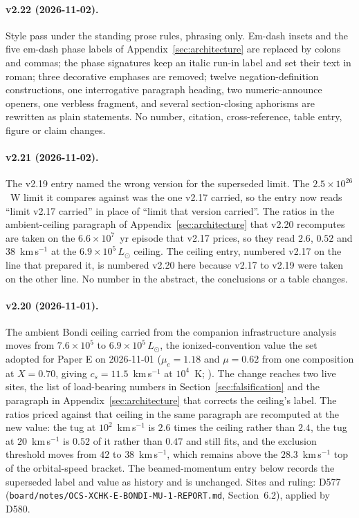 \documentclass[11pt]{article}
\begin{document}
\paragraph{v2.22 (2026-11-02).} Style pass under the standing prose rules, phrasing only. Em-dash insets and the five em-dash phase labels of Appendix~\ref{sec:architecture} are replaced by colons and commas; the phase signatures keep an italic run-in label and set their text in roman; three decorative emphases are removed; twelve negation-definition constructions, one interrogative paragraph heading, two numeric-announce openers, one verbless fragment, and several section-closing aphorisms are rewritten as plain statements. No number, citation, cross-reference, table entry, figure or claim changes.

\paragraph{v2.21 (2026-11-02).} The v2.19 entry named the wrong version for the superseded limit. The $2.5\times10^{26}$~W limit it compares against was the one v2.17 carried, so the entry now reads ``limit v2.17 carried'' in place of ``limit that version carried''. The ratios in the ambient-ceiling paragraph of Appendix~\ref{sec:architecture} that v2.20 recomputes are taken on the $6.6\times10^{7}$~yr episode that v2.17 prices, so they read $2.6$, $0.52$ and $38$~km\,s$^{-1}$ at the $6.9\times10^{5}\,L_\odot$ ceiling. The ceiling entry, numbered v2.17 on the line that prepared it, is numbered v2.20 here because v2.17 to v2.19 were taken on the other line. No number in the abstract, the conclusions or a table changes.

\paragraph{v2.20 (2026-11-01).} The ambient Bondi ceiling carried from the companion infrastructure analysis moves from $7.6\times10^{5}$ to $6.9\times10^{5}\,L_\odot$, the ionized-convention value the set adopted for Paper E on 2026-11-01 ($\mu_e = 1.18$ and $\mu = 0.62$ from one composition at $X = 0.70$, giving $c_s = 11.5$~km\,s$^{-1}$ at $10^{4}$~K; \citealt{Swanson2026Engineered}). The change reaches two live sites, the list of load-bearing numbers in Section~\ref{sec:falsification} and the paragraph in Appendix~\ref{sec:architecture} that corrects the ceiling's label. The ratios priced against that ceiling in the same paragraph are recomputed at the new value: the tug at $10^{2}$~km\,s$^{-1}$ is $2.6$ times the ceiling rather than $2.4$, the tug at $20$~km\,s$^{-1}$ is $0.52$ of it rather than $0.47$ and still fits, and the exclusion threshold moves from $42$ to $38$~km\,s$^{-1}$, which remains above the $28.3$~km\,s$^{-1}$ top of the orbital-speed bracket. The beamed-momentum entry below records the superseded label and value as history and is unchanged. Sites and ruling: D577 (\texttt{board/notes/OCS-XCHK-E-BONDI-MU-1-REPORT.md}, Section~6.2), applied by D580.
\end{document}
